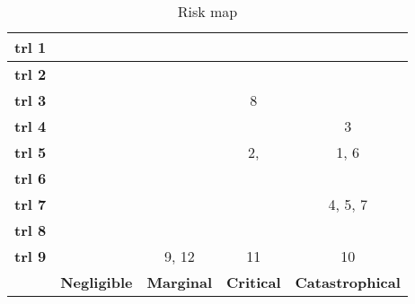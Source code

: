 \begin{table}[H]
	\centering
	\caption{Risk map}
	\label{tab:riskmap}
	\begin{tabular}{|c|c|c|c|c|} %
		\hline
		\textbf{\gls{trl} 1} & \cellcolor{green!70} & \cellcolor{yellow!75}  & \cellcolor{red!60} & \cellcolor{red!60}  \\ \hline
		\textbf{\gls{trl} 2} & \cellcolor{green!70} & \cellcolor{yellow!75}  & \cellcolor{red!60} & \cellcolor{red!60} \\ \hline
		\textbf{\gls{trl} 3} & \cellcolor{green!70} & \cellcolor{yellow!75} & \cellcolor{yellow!75} 8 & \cellcolor{red!60}  \\ \hline
		\textbf{\gls{trl} 4} & \cellcolor{green!70} & \cellcolor{yellow!75} & \cellcolor{yellow!75} & \cellcolor{yellow!75} 3 \\ \hline
		\textbf{\gls{trl} 5} & \cellcolor{green!70} & \cellcolor{green!70} & \cellcolor{yellow!75} 2, & \cellcolor{yellow!75} 1, 6 \\ \hline
		\textbf{\gls{trl} 6} & \cellcolor{green!70} & \cellcolor{green!70} & \cellcolor{green!70} & \cellcolor{green!70}\\ \hline
		\textbf{\gls{trl} 7} & \cellcolor{green!70} & \cellcolor{green!70} & \cellcolor{green!70} & \cellcolor{green!70} 4, 5, 7 \\ \hline
		\textbf{\gls{trl} 8} & \cellcolor{green!70} & \cellcolor{green!70} & \cellcolor{green!70} & \cellcolor{green!70} \\ \hline
		\textbf{\gls{trl} 9} & \cellcolor{green!70} & \cellcolor{green!70} 9, 12 & \cellcolor{green!70} 11 & \cellcolor{green!70} 10  \\ \hline
		& \textbf{Negligible} & \textbf{Marginal} & \textbf{Critical} & \textbf{Catastrophical} \\ \hline
	\end{tabular}
\end{table}

